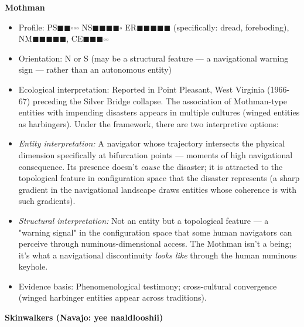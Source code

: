 \textbf{Mothman}

\begin{itemize}[nosep,leftmargin=*]
  \item Profile: PS$\blacksquare$$\blacksquare$$\square$$\square$$\square$ NS$\blacksquare$$\blacksquare$$\blacksquare$$\blacksquare$$\square$ ER$\blacksquare$$\blacksquare$$\blacksquare$$\blacksquare$$\blacksquare$ (specifically: dread, foreboding), NM$\blacksquare$$\blacksquare$$\blacksquare$$\blacksquare$$\blacksquare$, CE$\blacksquare$$\blacksquare$$\blacksquare$$\square$$\square$
  \item Orientation: N or S (may be a structural feature — a navigational warning sign — rather than an autonomous entity)
  \item Ecological interpretation: Reported in Point Pleasant, West Virginia (1966-67) preceding the Silver Bridge collapse. The association of Mothman-type entities with impending disasters appears in multiple cultures (winged entities as harbingers). Under the framework, there are two interpretive options:
  \item \textit{Entity interpretation:} A navigator whose trajectory intersects the physical dimension specifically at bifurcation points — moments of high navigational consequence. Its presence doesn't \textit{cause} the disaster; it is attracted to the topological feature in configuration space that the disaster represents (a sharp gradient in the navigational landscape draws entities whose coherence is with such gradients).
  \item \textit{Structural interpretation:} Not an entity but a topological feature — a "warning signal" in the configuration space that some human navigators can perceive through numinous-dimensional access. The Mothman isn't a being; it's what a navigational discontinuity \textit{looks like} through the human numinous keyhole.
  \item Evidence basis: Phenomenological testimony; cross-cultural convergence (winged harbinger entities appear across traditions).
\end{itemize}


\textbf{Skinwalkers (Navajo: yee naaldlooshii)}

